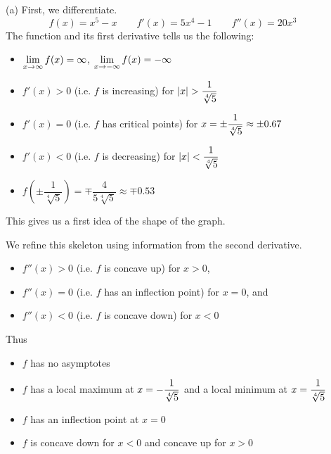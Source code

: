 \begin{solution}
(a)
First, we differentiate.
\[
f(x) = x^5-x\qquad
f'(x)=5x^4-1\qquad
f''(x)=20x^3\qquad
\]
The function and its first derivative tells us the following:
\begin{itemize}
\item $\displaystyle\lim_{x \to \infty} f(x)=\infty$, $\displaystyle\lim_{x \to -\infty} f(x)=-\infty$
\item $f'(x)> 0$ (i.e. $f$ is increasing) for
   $|x|> \dfrac{1}{\root{4}\of{5}}$
\item{}$f'(x)=0$ (i.e. $f$ has critical points) for $x= \pm\dfrac{1}{\root{4}\of{5}} \approx \pm 0.67$
\item{}$f'(x)< 0$ (i.e. $f$ is decreasing) for $|x| < \dfrac{1}{\root{4}\of{5}}$
\item $f\left(\pm\dfrac{1}{\sqrt[4]{5}}\right)=\mp\dfrac{4}{5\sqrt[4]{5}}\approx\mp0.53$
\end{itemize}
This gives us a first idea of the shape of the graph.
\begin{center}\end{center}
We refine this skeleton using information from the second derivative.
\begin{itemize}
\item $f''(x)> 0$ (i.e. $f$ is concave up) for $x> 0$,
\item{}$f''(x)=0$ (i.e. $f$ has an inflection point) for $x=0$, and
\item{}$f''(x)< 0$ (i.e. $f$ is concave down) for $x<0$
\end{itemize}
Thus
\begin{itemize}
\item $f$ has no asymptotes
\item $f$ has a local maximum at $x=-\dfrac{1}{\root{4}\of{5}}$
           and  a local minimum at $x=\dfrac{1}{\root{4}\of{5}}$
\item $f$ has an inflection point at $x=0$
\item $f$ is concave down for $x<0$ and concave up for $x>0$
\end{itemize}


\end{solution}
